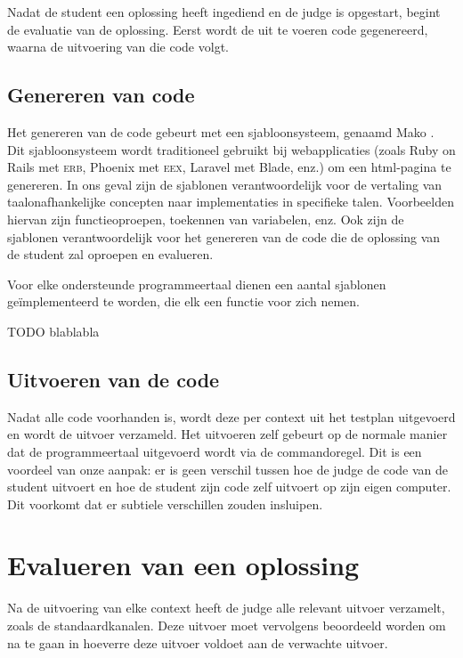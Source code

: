 Nadat de student een oplossing heeft ingediend en de judge is opgestart, begint de evaluatie van de oplossing.
Eerst wordt de uit te voeren code gegenereerd, waarna de uitvoering van die code volgt.

\subsection{Genereren van code}\label{subsec:genereren-van-code}

Het genereren van de code gebeurt met een sjabloonsysteem, genaamd Mako \autocite{mako}.
Dit sjabloonsysteem wordt traditioneel gebruikt bij webapplicaties (zoals Ruby on Rails met \textsc{erb}, Phoenix met \textsc{eex}, Laravel met Blade, enz.) om een html-pagina te genereren.
In ons geval zijn de sjablonen verantwoordelijk voor de vertaling van taalonafhankelijke concepten naar implementaties in specifieke talen.
Voorbeelden hiervan zijn functieoproepen, toekennen van variabelen, enz.
Ook zijn de sjablonen verantwoordelijk voor het genereren van de code die de oplossing van de student zal oproepen en evalueren.

Voor elke ondersteunde programmeertaal dienen een aantal sjablonen geïmplementeerd te worden, die elk een functie voor zich nemen.

TODO blablabla

\subsection{Uitvoeren van de code}\label{subsec:uitvoeren-van-de-code}

Nadat alle code voorhanden is, wordt deze per context uit het testplan uitgevoerd en wordt de uitvoer verzameld.
Het uitvoeren zelf gebeurt op de normale manier dat de programmeertaal uitgevoerd wordt via de commandoregel.
Dit is een voordeel van onze aanpak: er is geen verschil tussen hoe de judge de code van de student uitvoert en hoe de student zijn code zelf uitvoert op zijn eigen computer.
Dit voorkomt dat er subtiele verschillen zouden insluipen.

\section{Evalueren van een oplossing}\label{sec:evalueren-van-een-oplossing2}

Na de uitvoering van elke context heeft de judge alle relevant uitvoer verzamelt, zoals de standaardkanalen.
Deze uitvoer moet vervolgens beoordeeld worden om na te gaan in hoeverre deze uitvoer voldoet aan de verwachte uitvoer.
